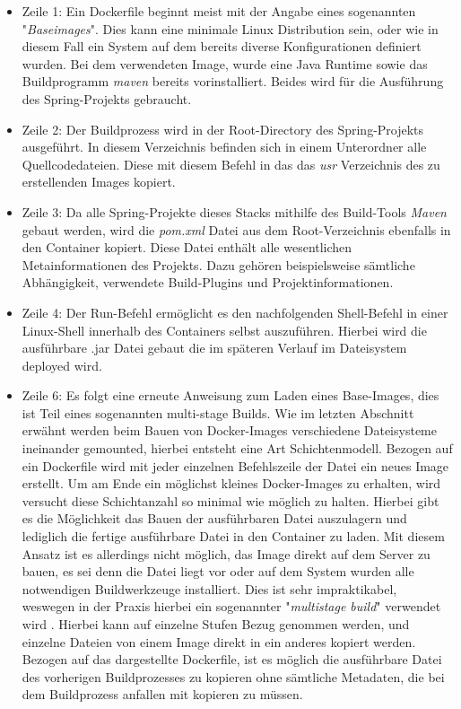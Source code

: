 \begin{itemize}
  \item Zeile 1: Ein Dockerfile beginnt meist mit der Angabe eines sogenannten "\emph{Baseimages}". Dies kann eine minimale Linux Distribution sein, oder wie in diesem Fall ein System auf dem bereits diverse Konfigurationen definiert wurden. Bei dem verwendeten Image, wurde eine Java Runtime sowie das Buildprogramm \emph{maven} bereits vorinstalliert. Beides wird für die Ausführung des Spring-Projekts gebraucht. 
  \item Zeile 2: Der Buildprozess wird in der Root-Directory des Spring-Projekts ausgeführt. In diesem Verzeichnis befinden sich in einem Unterordner alle Quellcodedateien. Diese mit diesem Befehl in das das \emph{usr} Verzeichnis des zu erstellenden Images kopiert. 
  \item Zeile 3: Da alle Spring-Projekte dieses Stacks mithilfe des Build-Tools \emph{Maven} gebaut werden, wird die \emph{pom.xml} Datei aus dem Root-Verzeichnis ebenfalls in den Container kopiert. Diese Datei enthält alle wesentlichen Metainformationen des Projekts. Dazu gehören beispielsweise sämtliche Abhängigkeit, verwendete Build-Plugins und Projektinformationen. 
  \item Zeile 4: Der Run-Befehl ermöglicht es den nachfolgenden Shell-Befehl in einer Linux-Shell innerhalb des Containers selbst auszuführen. Hierbei wird die ausführbare .jar Datei gebaut die im späteren Verlauf im Dateisystem deployed wird.
  \item Zeile 6: Es folgt eine erneute Anweisung zum Laden eines Base-Images, dies ist Teil eines sogenannten multi-stage Builds. Wie im letzten Abschnitt erwähnt werden beim Bauen von Docker-Images verschiedene Dateisysteme ineinander gemounted, hierbei entsteht eine Art Schichtenmodell. Bezogen auf ein Dockerfile wird mit jeder einzelnen Befehlszeile der Datei ein neues Image erstellt. Um am Ende ein möglichst kleines Docker-Images zu erhalten, wird versucht diese Schichtanzahl so minimal wie möglich zu halten. Hierbei gibt es die Möglichkeit das Bauen der ausführbaren Datei auszulagern und lediglich die fertige ausführbare Datei in den Container zu laden. Mit diesem Ansatz ist es allerdings nicht möglich, das Image direkt auf dem Server zu bauen, es sei denn die Datei liegt vor oder auf dem System wurden alle notwendigen Buildwerkzeuge installiert. Dies ist sehr impraktikabel, weswegen in der Praxis hierbei ein sogenannter "\emph{multistage build}" verwendet wird \cite[Kapitel~multi stage build]{docker-doc}. Hierbei kann auf einzelne Stufen Bezug genommen werden, und einzelne Dateien von einem Image direkt in ein anderes kopiert werden. Bezogen auf das dargestellte Dockerfile, ist es möglich die ausführbare Datei des vorherigen Buildprozesses zu kopieren ohne sämtliche Metadaten, die bei dem Buildprozess anfallen mit kopieren zu müssen.

\end{itemize}
